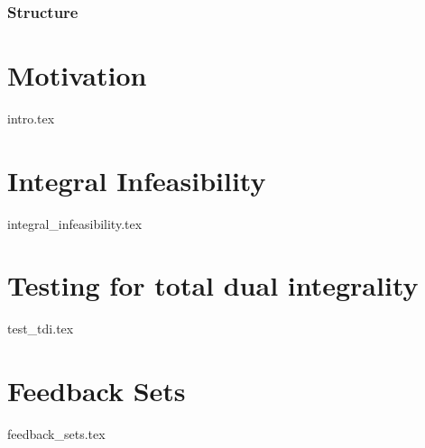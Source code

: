 \documentclass{beamer}
\begin{document}
    \begin{frame}
        \titlepage
    \end{frame}
    \begin{frame}
        \frametitle{Structure}
        \tableofcontents
    \end{frame}
    \section{Motivation}
    {intro.tex}

    \section{Integral Infeasibility}
    {integral_infeasibility.tex}

    \section{Testing for total dual integrality}
    {test_tdi.tex}

    \section{Feedback Sets}
    {feedback_sets.tex}
\end{document}
